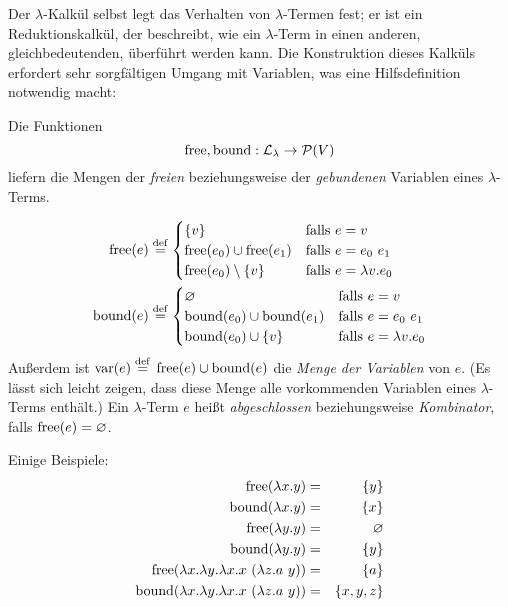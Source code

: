 Der $\lambda$-Kalkül selbst legt das Verhalten von $\lambda$-Termen
fest; er ist ein Reduktionskalkül, der beschreibt, wie ein
$\lambda$-Term in einen anderen, gleichbedeutenden, überführt werden
kann.  Die Konstruktion dieses Kalküls erfordert sehr sorgfältigen
Umgang mit Variablen, was eine Hilfsdefinition notwendig macht:
%
\begin{definition}
  Die Funktionen \[\operatorname{free}, \operatorname{bound} : \mathcal{L}_{\lambda}\rightarrow\mathcal{P}(V)\] liefern
  die Mengen der \emph{freien} beziehungsweise der  \emph{gebundenen} Variablen
  eines $\lambda$-Terms.%

  \begin{align*}
    \operatorname{free}(e) & \stackrel{\rm def}{=}
    \begin{cases}
      \{ v \}  & \text{falls } e  = v\\
      \operatorname{free}(e_0) \cup \operatorname{free}(e_1) & \text{falls } e = e_0~e_1\\
      \operatorname{free}(e_0) \setminus \{v\} & \text{falls } e = \lambda v.e_0
    \end{cases}\\
    \operatorname{bound}(e) & \stackrel{\rm def}{=}
    \begin{cases}
      \varnothing & \text{falls } e = v\\
      \operatorname{bound}(e_0) \cup \operatorname{bound}(e_1) & \text{falls } e = e_0~e_1\\
      \operatorname{bound}(e_0) \cup \{v\} & \text{falls } e = \lambda v.e_0
    \end{cases}
  \end{align*}
  Außerdem ist $\operatorname{var}(e) \stackrel{\rm def}{=}{} \operatorname{free}(e)\cup\operatorname{bound}(e)$ die \emph{Menge der
    Variablen} von $e$.  (Es lässt sich leicht zeigen, dass diese Menge
  alle vorkommenden Variablen eines $\lambda$-Terms enthält.)  Ein
  $\lambda$-Term $e$ heißt \emph{abgeschlossen} beziehungsweise 
  \textit{Kombinator}, falls $\operatorname{free}(e)=\varnothing$.
\end{definition}
%
Einige Beispiele:
%
\begin{eqnarray*}
  \operatorname{free}(\lambda x.y) &=& \{y\}\\
  \operatorname{bound}(\lambda x.y) &=& \{x\}\\
  \operatorname{free}(\lambda y.y) &=& \varnothing\\
  \operatorname{bound}(\lambda y.y) &=& \{y\}\\
  \operatorname{free}(\lambda x.\lambda y.\lambda x.x~(\lambda z.a~y)) &=& \{ a\}\\
  \operatorname{bound}(\lambda x.\lambda y.\lambda x.x~(\lambda z.a~y)) &=& \{ x,y,z\}
\end{eqnarray*}
